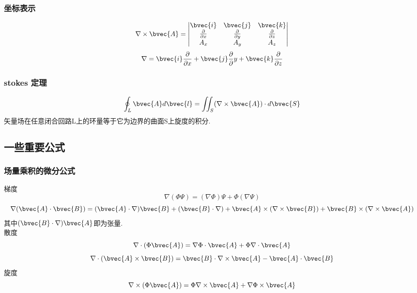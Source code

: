 \subsubsection{坐标表示}
\begin{equation}\label{VecAnl_eq12}
\nabla \times \bvec{A}=
\begin{vmatrix}
\bvec{i} & \bvec{j} & \bvec{k} \\
\frac{\partial}{\partial x} & \frac{\partial}{\partial y} & \frac{\partial}{\partial z}\\
A_x & A_y & A_z
\end{vmatrix}
\end{equation}
\begin{equation}\label{VecAnl_eq13}
\nabla = \bvec{i}\frac{\partial}{\partial x}+ \bvec{j} \frac{\partial}{\partial}y + \bvec{k} \frac{\partial}{\partial z}
\end{equation}

\subsubsection{stokes 定理}
\begin{equation}\label{VecAnl_eq14}
\oint_L \bvec{A} d\bvec{l}=\iint_S (\nabla \times \bvec{A})\cdot d\bvec{S}
\end{equation}
矢量场在任意闭合回路L上的环量等于它为边界的曲面S上旋度的积分.

\subsection{一些重要公式}
\subsubsection{场量乘积的微分公式}
梯度
\begin{equation}\label{VecAnl_eq15}
\nabla(\Phi \Psi)=(\nabla \Phi)\Psi+\Phi(\nabla \Psi)
\end{equation}
\begin{equation}\label{VecAnl_eq16}
\nabla(\bvec{A} \cdot \bvec{B})=(\bvec{A} \cdot \nabla)\bvec{B}+(\bvec{B}\cdot\nabla)+\bvec{A}\times(\nabla \times \bvec{B})+\bvec{B}\times(\nabla \times \bvec{A})
\end{equation}
其中$(\bvec{B}\cdot\nabla)\bvec{A}$即为张量.\\
散度\\
\begin{equation}\label{VecAnl_eq17}
\nabla\cdot(\Phi\bvec{A})=\nabla\Phi\cdot\bvec{A}+\Phi\nabla\cdot\bvec{A}
\end{equation}
\begin{equation}\label{VecAnl_eq18}
\nabla\cdot(\bvec{A}\times\bvec{B})=\bvec{B}\cdot\nabla\times\bvec{A}-\bvec{A}\cdot\bvec{B}
\end{equation}
旋度\\
\begin{equation}\label{VecAnl_eq19}
\nabla\times(\Phi\bvec{A})=\Phi\nabla\times\bvec{A}+\nabla\Phi\times\bvec{A}
\end{equation}

